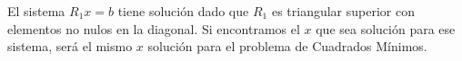 El sistema $R_1x=b$ tiene solución dado que $R_1$ es triangular superior con elementos no nulos en la diagonal. Si encontramos el $x$ que sea solución para ese sistema, será el mismo $x$ solución para el problema de Cuadrados Mínimos.









